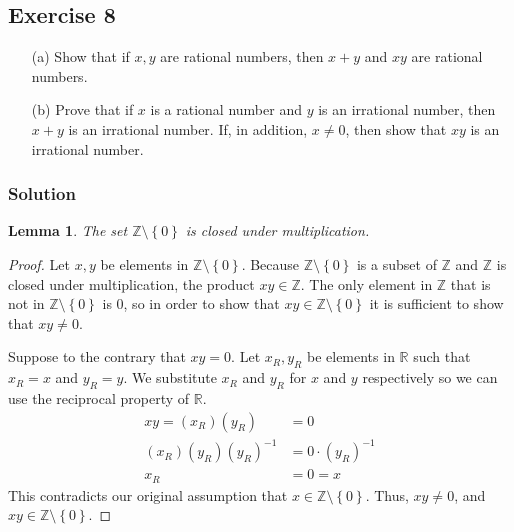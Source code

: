 \documentclass[12pt]{article}
\newtheorem{lem}{Lemma}
\begin{document}
\subsection*{Exercise 8}
\begin{itemize}
\item[(a)] Show that if $x, y$ are rational numbers, then $x + y$ and $xy$ are rational numbers.
\item[(b)] Prove that if $x$ is a rational number and $y$ is an irrational number, then $x + y$ is an irrational number. If, in addition, $x \neq 0$, then show that $xy$ is an irrational number.
\end{itemize}
\subsubsection*{Solution}
\begin{lem}
The set $\mathbb{Z} \setminus \left\{0\right\}$ is closed under multiplication.
\end{lem}
\begin{proof}
Let $x, y$ be elements in $\mathbb{Z} \setminus \left\{0\right\}$. Because $\mathbb{Z} \setminus \left\{0\right\}$ is a subset of $\mathbb{Z}$ and $\mathbb{Z}$ is closed under multiplication, the product $xy \in \mathbb{Z}$. The only element in $\mathbb{Z}$ that is not in $\mathbb{Z} \setminus \left\{0\right\}$ is 0, so in order to show that $xy \in \mathbb{Z} \setminus \left\{0\right\}$ it is sufficient to show that $xy \neq 0$.

Suppose to the contrary that $xy = 0$. Let $x_R, y_R$ be elements in $\mathbb{R}$ such that $x_R = x$ and $y_R = y$. We substitute $x_R$ and $y_R$ for $x$ and $y$ respectively so we can use the reciprocal property of $\mathbb{R}$.
\begin{align*}
xy = \left(x_R\right) \left(y_R\right) &= 0 \\
\left(x_R\right) \left(y_R\right) \left(y_R\right)^{-1} &= 0\cdot\left(y_R\right)^{-1} \\
x_R &= 0 = x
\end{align*}
This contradicts our original assumption that $x \in \mathbb{Z} \setminus \left\{0\right\}$. Thus, $xy \neq 0$, and $xy \in \mathbb{Z} \setminus \left\{0\right\}$.
\end{proof}
\end{document}
